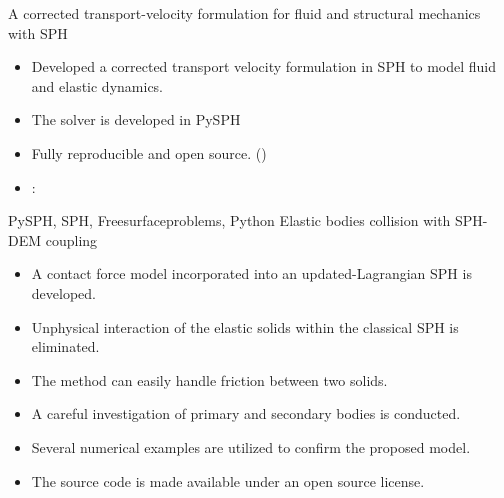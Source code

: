 %
%



\begin{experiences}


  \experience
    {}   {A corrected transport-velocity formulation for fluid and structural mechanics with SPH}{}{}
    {} {
                      \begin{itemize}
                      \item Developed a corrected transport velocity formulation in SPH to model
                        fluid and elastic dynamics.
                      \item The solver is developed in PySPH %
                      \item Fully reproducible and open source. ()
                      \item \faGithub: 
                      \end{itemize}
                    }
                    {PySPH, SPH, Freesurfaceproblems, Python}
  \emptySeparator
  \experience
  {} {Elastic bodies collision with SPH-DEM coupling}{}{}
  {} {
                      \begin{itemize}
                      \item  A contact force model incorporated into an updated-Lagrangian SPH is developed.
                      \item  Unphysical interaction of the elastic solids within the classical SPH is eliminated.
                      \item  The method can easily handle friction between two solids.
                      \item  A careful investigation of primary and secondary bodies is conducted.
                      \item  Several numerical examples are utilized to confirm the proposed model.
                      \item  The source code is made available under an open source license.
                      \end{itemize}
}
\end{experiences}
